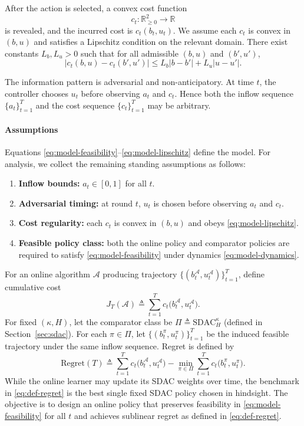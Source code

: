 \documentclass[11pt]{article}
\begin{document}
After the action is selected, a convex cost function
\[
c_t: \mathbb{R}_{\ge 0}^2 \to \mathbb{R}
\]
is revealed, and the incurred cost is $c_t(b_t,u_t)$. We assume each $c_t$ is convex in $(b,u)$ and satisfies a Lipschitz condition on the relevant domain. There exist constants $L_b,L_u>0$ such that for all admissible $(b,u)$ and $(b',u')$,
\begin{equation}
\label{eq:model-lipschitz}
|c_t(b,u)-c_t(b',u')| \le L_b|b-b'| + L_u|u-u'|.
\end{equation}

The information pattern is adversarial and non-anticipatory. At time $t$, the controller chooses $u_t$ before observing $a_t$ and $c_t$. Hence both the inflow sequence $\{a_t\}_{t=1}^T$ and the cost sequence $\{c_t\}_{t=1}^T$ may be arbitrary.

\paragraph{Assumptions}
Equations \eqref{eq:model-feasibility}--\eqref{eq:model-lipschitz} define the model. For analysis, we collect the remaining standing assumptions as follows:
\begin{enumerate}
    \item \textbf{Inflow bounds:} $a_t\in[0,1]$ for all $t$.
    \item \textbf{Adversarial timing:} at round $t$, $u_t$ is chosen before observing $a_t$ and $c_t$.
    \item \textbf{Cost regularity:} each $c_t$ is convex in $(b,u)$ and obeys \eqref{eq:model-lipschitz}.
    \item \textbf{Feasible policy class:} both the online policy and comparator policies are required to satisfy \eqref{eq:model-feasibility} under dynamics \eqref{eq:model-dynamics}.
\end{enumerate}

For an online algorithm $\mathcal{A}$ producing trajectory $\{(b_t^{\mathcal{A}},u_t^{\mathcal{A}})\}_{t=1}^T$, define cumulative cost
\begin{equation}
\label{eq:def-cumulative-cost}
J_T(\mathcal{A}) \triangleq \sum_{t=1}^T c_t\bigl(b_t^{\mathcal{A}},u_t^{\mathcal{A}}\bigr).
\end{equation}
For fixed $(\kappa,H)$, let the comparator class be $\Pi\triangleq\mathrm{SDAC}_H^{\kappa}$ (defined in Section~\ref{sec:sdac}). For each $\pi\in\Pi$, let $\{(b_t^{\pi},u_t^{\pi})\}_{t=1}^T$ be the induced feasible trajectory under the same inflow sequence. Regret is defined by
\begin{equation}
\label{eq:def-regret}
\mathrm{Regret}(T)
\triangleq
\sum_{t=1}^T c_t\bigl(b_t^{\mathcal{A}},u_t^{\mathcal{A}}\bigr)
-
\min_{\pi\in\Pi}
\sum_{t=1}^T c_t\bigl(b_t^{\pi},u_t^{\pi}\bigr).
\end{equation}
While the online learner may update its SDAC weights over time, the benchmark in \eqref{eq:def-regret} is the best single fixed SDAC policy chosen in hindsight.
The objective is to design an online policy that preserves feasibility in \eqref{eq:model-feasibility} for all $t$ and achieves sublinear regret as defined in \eqref{eq:def-regret}.
\end{document}
